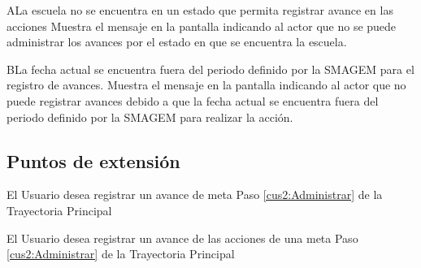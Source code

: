     \begin{UCtrayectoriaA}{A}{La escuela no se encuentra en un estado que permita registrar avance en las acciones}
    \UCpaso[\UCactor] Muestra el mensaje  en la pantalla  indicando al actor que no se puede administrar los avances por el estado en que se encuentra la escuela.
    \end{UCtrayectoriaA}

    \begin{UCtrayectoriaA}{B}{La fecha actual se encuentra fuera del periodo definido por la SMAGEM para el registro de avances.}
    \UCpaso[\UCsist] Muestra el mensaje  en la pantalla  indicando al actor que no puede registrar avances debido a que la fecha actual se encuentra fuera del periodo definido por la SMAGEM para realizar la acción. 
    \end{UCtrayectoriaA}

\subsection{Puntos de extensión}

\UCExtensionPoint
{El Usuario desea registrar un avance de meta}
{Paso \ref{cus2:Administrar} de la Trayectoria Principal}
{}

\UCExtensionPoint
{El Usuario desea registrar un avance de las acciones de una meta}
{Paso \ref{cus2:Administrar} de la Trayectoria Principal}
{}
